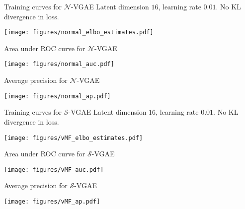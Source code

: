 \begin{frame}{Training curves for $\mathcal{N}$-VGAE}
  Latent dimension $16$, learning rate $0.01$. No KL divergence in loss.
  \begin{center}
    \texttt{[image: figures/normal\_elbo\_estimates.pdf]}
  \end{center}
\end{frame}

\begin{frame}{Area under ROC curve for $\mathcal{N}$-VGAE}
  \begin{center}
    \texttt{[image: figures/normal\_auc.pdf]}
  \end{center}
\end{frame}

\begin{frame}{Average precision for $\mathcal{N}$-VGAE}
  \begin{center}
    \texttt{[image: figures/normal\_ap.pdf]}
  \end{center}
\end{frame}

\begin{frame}{Training curves for $\mathcal{S}$-VGAE}
  Latent dimension $16$, learning rate $0.01$. No KL divergence in loss.
  \begin{center}
    \texttt{[image: figures/vMF\_elbo\_estimates.pdf]}
  \end{center}
\end{frame}

\begin{frame}{Area under ROC curve for $\mathcal{S}$-VGAE}
  \begin{center}
    \texttt{[image: figures/vMF\_auc.pdf]}
  \end{center}
\end{frame}

\begin{frame}{Average precision for $\mathcal{S}$-VGAE}
  \begin{center}
    \texttt{[image: figures/vMF\_ap.pdf]}
  \end{center}
\end{frame}